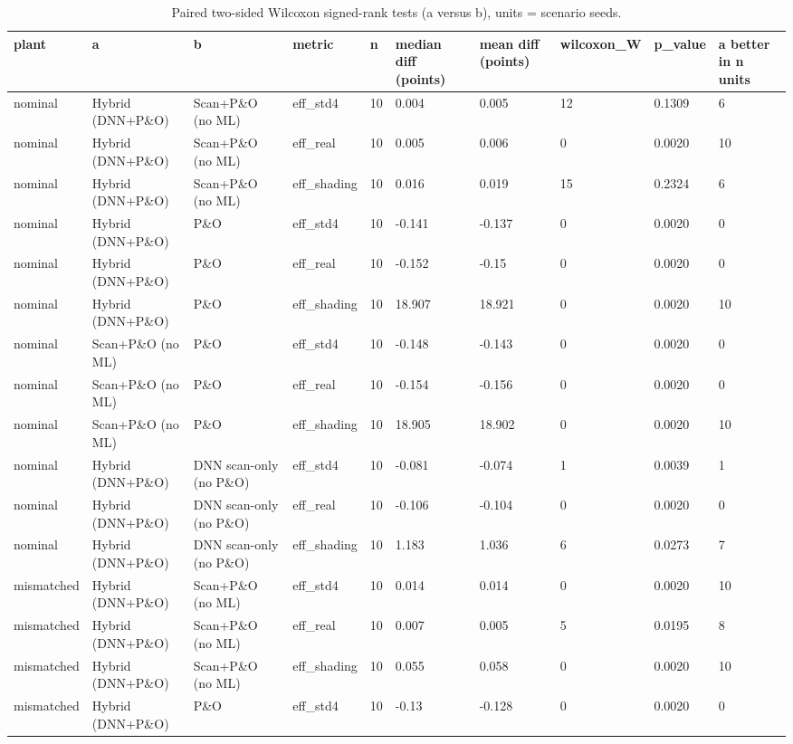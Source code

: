 \begin{table}[t]
\centering
\caption{Paired two-sided Wilcoxon signed-rank tests (a versus b), units = scenario seeds.}
\label{tab:Table_Wilcoxon}
\small
\begin{tabular}{llllllllll}
\hline
plant & a & b & metric & n & median diff (points) & mean diff (points) & wilcoxon\_W & p\_value & a better in n units \\
\hline
nominal & Hybrid (DNN+P\&O) & Scan+P\&O (no ML) & eff\_std4 & 10 & 0.004 & 0.005 & 12 & 0.1309 & 6 \\
nominal & Hybrid (DNN+P\&O) & Scan+P\&O (no ML) & eff\_real & 10 & 0.005 & 0.006 & 0 & 0.0020 & 10 \\
nominal & Hybrid (DNN+P\&O) & Scan+P\&O (no ML) & eff\_shading & 10 & 0.016 & 0.019 & 15 & 0.2324 & 6 \\
nominal & Hybrid (DNN+P\&O) & P\&O & eff\_std4 & 10 & -0.141 & -0.137 & 0 & 0.0020 & 0 \\
nominal & Hybrid (DNN+P\&O) & P\&O & eff\_real & 10 & -0.152 & -0.15 & 0 & 0.0020 & 0 \\
nominal & Hybrid (DNN+P\&O) & P\&O & eff\_shading & 10 & 18.907 & 18.921 & 0 & 0.0020 & 10 \\
nominal & Scan+P\&O (no ML) & P\&O & eff\_std4 & 10 & -0.148 & -0.143 & 0 & 0.0020 & 0 \\
nominal & Scan+P\&O (no ML) & P\&O & eff\_real & 10 & -0.154 & -0.156 & 0 & 0.0020 & 0 \\
nominal & Scan+P\&O (no ML) & P\&O & eff\_shading & 10 & 18.905 & 18.902 & 0 & 0.0020 & 10 \\
nominal & Hybrid (DNN+P\&O) & DNN scan-only (no P\&O) & eff\_std4 & 10 & -0.081 & -0.074 & 1 & 0.0039 & 1 \\
nominal & Hybrid (DNN+P\&O) & DNN scan-only (no P\&O) & eff\_real & 10 & -0.106 & -0.104 & 0 & 0.0020 & 0 \\
nominal & Hybrid (DNN+P\&O) & DNN scan-only (no P\&O) & eff\_shading & 10 & 1.183 & 1.036 & 6 & 0.0273 & 7 \\
mismatched & Hybrid (DNN+P\&O) & Scan+P\&O (no ML) & eff\_std4 & 10 & 0.014 & 0.014 & 0 & 0.0020 & 10 \\
mismatched & Hybrid (DNN+P\&O) & Scan+P\&O (no ML) & eff\_real & 10 & 0.007 & 0.005 & 5 & 0.0195 & 8 \\
mismatched & Hybrid (DNN+P\&O) & Scan+P\&O (no ML) & eff\_shading & 10 & 0.055 & 0.058 & 0 & 0.0020 & 10 \\
mismatched & Hybrid (DNN+P\&O) & P\&O & eff\_std4 & 10 & -0.13 & -0.128 & 0 & 0.0020 & 0 \\

\end{tabular}
\end{table}
